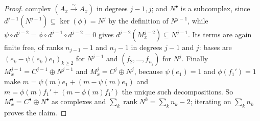 \begin{proof}
complex $(A_x\xrightarrow{\sim}A_x)$ in degrees $j-1,j$; and
$N^{\bullet}$ is a subcomplex, since
$d^{j-1}(N^{j-1})\subseteq\ker(\phi)=N^{j}$ by the definition of
$N^{j-1}$, while $\psi\circ d^{j-2}=\phi\circ d^{j-1}\circ d^{j-2}=0$
gives $d^{j-2}(M^{j-2}_x)\subseteq N^{j-1}$.  Its terms are again
finite free, of ranks $n_{j-1}-1$ and $n_j-1$ in degrees $j-1$ and
$j$: bases are $(e_k-\psi(e_k)e_1)_{k\ge2}$ for $N^{j-1}$ and
$(f_2,\dots,f_{n_j})$ for $N^{j}$.  Finally
$M^{j-1}_x=C^{j-1}\oplus N^{j-1}$ and $M^{j}_x=C^{j}\oplus N^{j}$,
because $\psi(e_1)=1$ and $\phi(f_1')=1$ make
$m=\psi(m)e_1+(m-\psi(m)e_1)$ and $m=\phi(m)f_1'+(m-\phi(m)f_1')$ the
unique such decompositions.  So
$M^{\bullet}_x=C^{\bullet}\oplus N^{\bullet}$ as complexes and
$\sum_k\operatorname{rank}N^{k}=\sum_kn_k-2$; iterating on
$\sum_kn_k$ proves the claim.


\end{proof}
